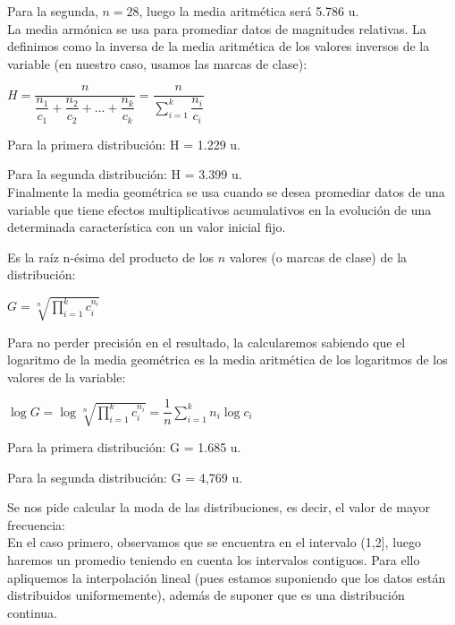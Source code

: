 Para la segunda, $n = 28$, luego la media aritmética será 5.786 u. \\


La media armónica se usa para promediar datos de magnitudes relativas. La definimos como la inversa de la media aritmética de los valores inversos de la variable (en nuestro caso, usamos las marcas de clase):
\begin{center}
	$H = \dfrac{n}{\dfrac{n_1}{c_1}+\dfrac{n_2}{c_2}+ ...+\dfrac{n_k}{c_k}} = \dfrac{n}{\sum_{i=1}^{k}\dfrac{n_i}{c_i}}$
\end{center}

Para la primera distribución: H = 1.229 u.

Para la segunda distribución: H = 3.399 u.  \\


Finalmente la media geométrica se usa cuando se desea promediar datos de una variable que tiene efectos
multiplicativos acumulativos en la evolución de una determinada característica con un
valor inicial fijo.

Es la raíz n-ésima del producto de los $n$ valores (o marcas de clase) de la distribución:

\begin{center}
	$G = \sqrt[n]{\prod_{i=1}^{k}c_i^{n_i}}$
\end{center}

Para no perder precisión en el resultado, la calcularemos sabiendo que el logaritmo de la media geométrica es la media aritmética de los logaritmos de los valores de la variable:

\begin{center}
	$\log G = \log \sqrt[n]{\prod_{i=1}^{k}c_i^{n_i}} = \dfrac{1}{n}\sum_{i=1}^{k}n_i \log c_i$
\end{center}

Para la primera distribución: G = 1.685 u.

Para la segunda distribución: G = 4,769 u.  \\


\subproblem

Se nos pide calcular la moda de las distribuciones, es decir, el valor  de mayor frecuencia: \\

En el caso primero, observamos que se encuentra en el intervalo (1,2], luego haremos un promedio teniendo en cuenta los intervalos contiguos. Para ello apliquemos la interpolación lineal (pues estamos suponiendo que los datos están distribuidos uniformemente), además de suponer que es una distribución continua.

